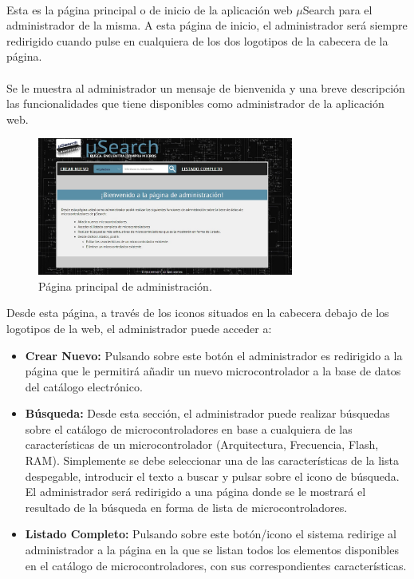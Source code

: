\paragraph{}Esta es la página principal o de inicio de la aplicación web $\mu$Search para el administrador de la misma. A esta página de inicio, el administrador será siempre redirigido cuando pulse en cualquiera de los dos logotipos de la cabecera de la página.

\paragraph{}Se le muestra al administrador un mensaje de bienvenida y una breve descripción las funcionalidades que tiene disponibles como administrador de la aplicación web.

\begin{figure}[h!]
	\centering
	\includegraphics[width=0.75\textwidth]{img/principal_admin}
	\caption{Página principal de administración.}
	\label{fig:principal_admin}
\end{figure}

Desde esta página, a través de los iconos situados en la cabecera debajo de los logotipos de la web, el administrador puede acceder a:
\begin{itemize}
	
	\item \textbf{Crear Nuevo:} Pulsando sobre este botón el administrador es redirigido a la página que le permitirá añadir un nuevo microcontrolador a la base de datos del catálogo electrónico.
	
	\item \textbf{Búsqueda:} Desde esta sección, el administrador puede realizar búsquedas sobre el catálogo de microcontroladores en base a cualquiera de las características de un microcontrolador (Arquitectura, Frecuencia, Flash, RAM). Simplemente se debe seleccionar una de las características de la lista despegable, introducir el texto a buscar y pulsar sobre el icono de búsqueda.
	El administrador será redirigido a una página donde se le mostrará el resultado de la búsqueda en forma de lista de microcontroladores.
	
	\item \textbf{Listado Completo:} Pulsando sobre este botón/icono el sistema redirige al administrador a la página en la que se listan todos los elementos disponibles en el catálogo de microcontroladores, con sus correspondientes características.
	
\end{itemize}